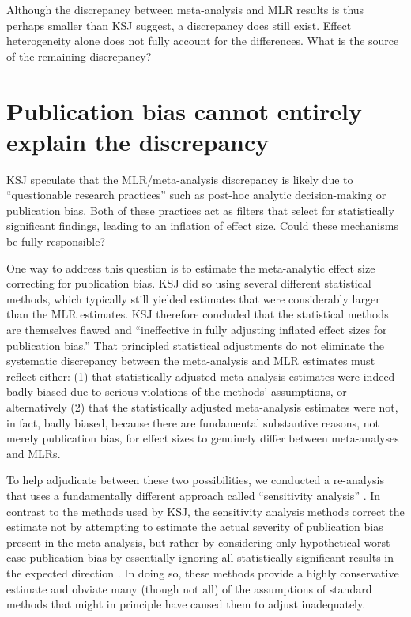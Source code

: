 \documentclass[man]{apa7}
\begin{document}
Although the discrepancy between meta-analysis and MLR results is thus perhaps smaller than KSJ suggest, a discrepancy does still exist. Effect heterogeneity alone does not fully account for the differences. What is the source of the remaining discrepancy? 

\section{Publication bias cannot entirely explain the discrepancy}

KSJ speculate that the MLR/meta-analysis discrepancy is likely due to “questionable research practices” \parencite{masicampo2012peculiar} such as post-hoc analytic decision-making or publication bias. Both of these practices act as filters that select for statistically significant findings, leading to an inflation of effect size. Could these mechanisms be fully responsible? 

One way to address this question is to estimate the meta-analytic effect size correcting for publication bias. KSJ did so using several different statistical methods, which typically still yielded estimates that were considerably larger than the MLR estimates. KSJ therefore concluded that the statistical methods are themselves flawed and ``ineffective in fully adjusting inflated effect sizes for publication bias.'' That principled statistical adjustments \parencite{vevea1995general} do not eliminate the systematic discrepancy between the meta-analysis and MLR estimates must reflect either: (1) that statistically adjusted meta-analysis estimates were indeed badly biased due to serious violations of the methods' assumptions, or alternatively (2) that the statistically adjusted meta-analysis estimates were not, in fact, badly biased, because there are fundamental substantive reasons, not merely publication bias, for effect sizes to genuinely differ between meta-analyses and MLRs.  

To help adjudicate between these two possibilities, we conducted a re-analysis that uses a fundamentally different approach called ``sensitivity analysis'' \parencite{mathur2019sensitivity}. In contrast to the methods used by KSJ, the sensitivity analysis methods correct the estimate not by attempting to estimate the actual severity of publication bias present in the meta-analysis, but rather by considering only hypothetical worst-case publication bias by essentially ignoring all statistically significant results in the expected direction \parencite{mathur2019sensitivity}. In doing so, these methods provide a highly conservative estimate and obviate many (though not all) of the assumptions of standard methods that might in principle have caused them to adjust inadequately.
\end{document}
